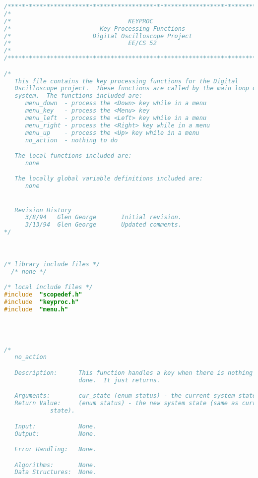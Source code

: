 \begin{lstlisting}[language=C]
/****************************************************************************/
/*                                                                          */
/*                                 KEYPROC                                  */
/*                         Key Processing Functions                         */
/*                       Digital Oscilloscope Project                       */
/*                                 EE/CS 52                                 */
/*                                                                          */
/****************************************************************************/

/*
   This file contains the key processing functions for the Digital
   Oscilloscope project.  These functions are called by the main loop of the
   system.  The functions included are:
      menu_down  - process the <Down> key while in a menu
      menu_key   - process the <Menu> key
      menu_left  - process the <Left> key while in a menu
      menu_right - process the <Right> key while in a menu
      menu_up    - process the <Up> key while in a menu
      no_action  - nothing to do

   The local functions included are:
      none

   The locally global variable definitions included are:
      none


   Revision History
      3/8/94   Glen George       Initial revision.
      3/13/94  Glen George       Updated comments.
*/



/* library include files */
  /* none */

/* local include files */
#include  "scopedef.h"
#include  "keyproc.h"
#include  "menu.h"




/*
   no_action

   Description:      This function handles a key when there is nothing to be
                     done.  It just returns.

   Arguments:        cur_state (enum status) - the current system state.
   Return Value:     (enum status) - the new system state (same as current
   		     state).

   Input:            None.
   Output:           None.

   Error Handling:   None.

   Algorithms:       None.
   Data Structures:  None.


\end{lstlisting}
